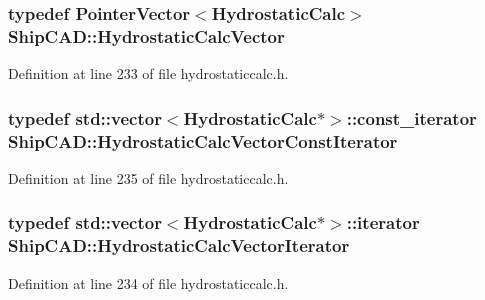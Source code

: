 \subsubsection[{\texorpdfstring{Hydrostatic\+Calc\+Vector}{HydrostaticCalcVector}}]{\setlength{\rightskip}{0pt plus 5cm}typedef {\bf Pointer\+Vector}$<${\bf Hydrostatic\+Calc}$>$ {\bf Ship\+C\+A\+D\+::\+Hydrostatic\+Calc\+Vector}}\hypertarget{namespaceShipCAD_a0c7b012d8868cbb43871cf0bf303ccc6}{}\label{namespaceShipCAD_a0c7b012d8868cbb43871cf0bf303ccc6}


Definition at line 233 of file hydrostaticcalc.\+h.

\subsubsection[{\texorpdfstring{Hydrostatic\+Calc\+Vector\+Const\+Iterator}{HydrostaticCalcVectorConstIterator}}]{\setlength{\rightskip}{0pt plus 5cm}typedef std\+::vector$<${\bf Hydrostatic\+Calc}$\ast$$>$\+::const\+\_\+iterator {\bf Ship\+C\+A\+D\+::\+Hydrostatic\+Calc\+Vector\+Const\+Iterator}}\hypertarget{namespaceShipCAD_afd3fb43e1160083a9aee5f5d076abf43}{}\label{namespaceShipCAD_afd3fb43e1160083a9aee5f5d076abf43}


Definition at line 235 of file hydrostaticcalc.\+h.

\subsubsection[{\texorpdfstring{Hydrostatic\+Calc\+Vector\+Iterator}{HydrostaticCalcVectorIterator}}]{\setlength{\rightskip}{0pt plus 5cm}typedef std\+::vector$<${\bf Hydrostatic\+Calc}$\ast$$>$\+::iterator {\bf Ship\+C\+A\+D\+::\+Hydrostatic\+Calc\+Vector\+Iterator}}\hypertarget{namespaceShipCAD_a09b1b198129010214012a1cc49c98e28}{}\label{namespaceShipCAD_a09b1b198129010214012a1cc49c98e28}


Definition at line 234 of file hydrostaticcalc.\+h.

